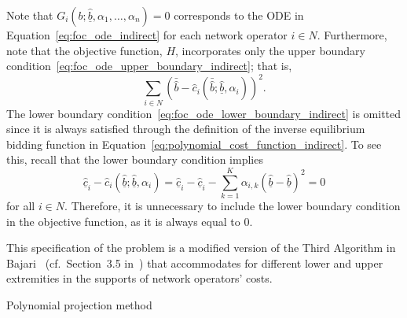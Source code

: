 Note that $G_i(b; \underline{\hat{b}}, \alpha_1,\dotsc, \alpha_n) = 0$ corresponds to the ODE in Equation~\eqref{eq:foc_ode_indirect} for each network operator $i\in N$. Furthermore, note that the objective function, $H$, incorporates only the upper boundary condition~\eqref{eq:foc_ode_upper_boundary_indirect}; that is,
\begin{equation}
  \sum_{i\in N} (\bar{\hat{b}} - \hat{c}_i(\bar{\hat{b}}; \underline{\hat{b}}, \alpha_i))^2.
\end{equation}
The lower boundary condition~\eqref{eq:foc_ode_lower_boundary_indirect} is omitted since it is always satisfied through the definition of the inverse equilibrium bidding function in Equation~\eqref{eq:polynomial_cost_function_indirect}. To see this, recall that the lower boundary condition implies
\begin{equation}
  \underline{\hat{c}}_i - \hat{c}_i(\underline{\hat{b}}; \underline{\hat{b}}, \alpha_i) = \underline{\hat{c}}_i - \underline{\hat{c}}_i -\sum_{k=1}^K \alpha_{i,k} (\underline{\hat{b}} - \underline{\hat{b}})^2 = 0
\end{equation}
for all $i\in N$. Therefore, it is unnecessary to include the lower boundary condition in the objective function, as it is always equal to $0$.

This specification of the problem is a modified version of the Third Algorithm in Bajari~\cite{Bajari2001a} (cf.~Section~3.5 in~\cite{Bajari2001a}) that accommodates for different lower and upper extremities in the supports of network operators' costs.

\begin{algorithm}
\caption{Polynomial projection method}
\label{alg:polynomial_projection_method_indirect}
\begin{algorithmic}[1]
  \Statex
  \EndFor
  \Statex
  \Repeat
    \EndFor
\end{algorithmic}
\end{algorithm}

